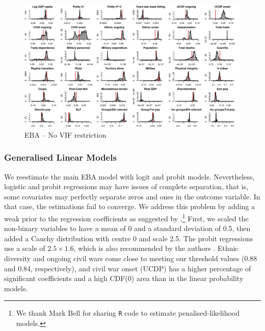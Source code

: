 \clearpage
\begin{figure}
    \centering
    \includegraphics[width=\textwidth]{images/mk-no-vif.pdf}
    \caption{EBA -- No VIF restriction}
    \label{fig:mk-no-vif}
\end{figure}
\clearpage

\subsubsection{Generalised Linear Models}

We reestimate the main EBA model with logit and probit models. Nevertheless, logistic and probit regressions may have issues of complete separation, that is, some covariates may perfectly separate zeros and ones in the outcome variable. In that case, the estimations fail to converge. We address this problem by adding a weak prior to the regression coefficients as suggested by \citet{gelman2008weakly}.\footnote{We thank Mark Bell for sharing \texttt{R} code to estimate penalised-likelihood models.} First, we scaled the non-binary variables to have a mean of 0 and a standard deviation of 0.5, then added a Cauchy distribution with centre 0 and scale 2.5. The probit regressions use a scale of $2.5 \times 1.6$, which is also recommended by the authors \citep{arm2017rpackage}. Ethnic diversity and ongoing civil wars come close to meeting our threshold values (0.88 and 0.84, respectively), and civil war onset (UCDP) has a higher percentage of significant coefficients and a high CDF(0) area than in the linear probability models.

\vspace{1cm}

